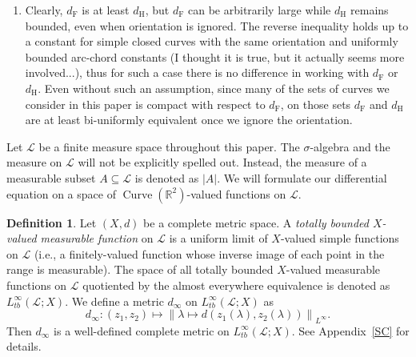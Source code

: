 \documentclass[reqno,centertags,12pt]{amsart}
\theoremstyle{definition}
\newtheorem{definition}[theorem]{Definition}
\numberwithin{equation}{section}
\newcommand{\abs}[1]{\left\lvert#1\right\rvert}
\newcommand{\norm}[1]{\left\|#1\right\|}
\newcommand{\bbR}{{\mathbb{R}}}
\begin{document}
\begin{enumerate}
    \item Clearly, $d_{\mathrm{F}}$ is at least $d_{\mathrm{H}}$,
    but $d_{\mathrm{F}}$ can be arbitrarily large while $d_{\mathrm{H}}$ remains bounded,
    even when orientation is ignored. The reverse inequality
    holds up to a constant for simple closed curves with the same orientation and uniformly
    bounded arc-chord constants ({\color{red}I thought it is true,
    but it actually seems more involved...}), thus for such a case
    there is no difference in working with $d_{\mathrm{F}}$ or $d_{\mathrm{H}}$.
    Even without such an assumption, since many of the sets of curves we consider
    in this paper is compact with respect to $d_{\mathrm{F}}$, on those sets
    $d_{\mathrm{F}}$ and $d_{\mathrm{H}}$ are at least bi-uniformly equivalent
    once we ignore the orientation.
\end{enumerate}

Let $\mathcal{L}$ be a finite measure space throughout this paper.
The $\sigma$-algebra and the measure on $\mathcal{L}$ will not be explicitly spelled out.
Instead, the measure of a measurable subset $A\subseteq\mathcal{L}$ is denoted as
$\abs{A}$. We will formulate our differential equation on a space of
$\operatorname{Curve}(\bbR^{2})$-valued functions on $\mathcal{L}$.

\begin{definition}
    Let $(X,d)$ be a complete metric space. A \emph{totally bounded $X$-valued
    measurable function} on $\mathcal{L}$ is a uniform limit of
    $X$-valued simple functions on $\mathcal{L}$ (i.e., a finitely-valued function
    whose inverse image of each point in the range is measurable).
    The space of all totally bounded $X$-valued measurable functions on $\mathcal{L}$
    quotiented by the almost everywhere equivalence is denoted as
    $L_{tb}^{\infty}(\mathcal{L};X)$. We define a metric $d_{\infty}$ on
    $L_{tb}^{\infty}(\mathcal{L};X)$ as
    \[
        d_{\infty}\colon (z_{1},z_{2})
        \mapsto \norm{\lambda\mapsto d(z_{1}(\lambda), z_{2}(\lambda))}_{L^{\infty}}.
    \]
    Then $d_{\infty}$ is a well-defined complete metric on $L_{tb}^{\infty}(\mathcal{L};X)$.
    See Appendix~\ref{SC} for details.
\end{definition}
\end{document}
